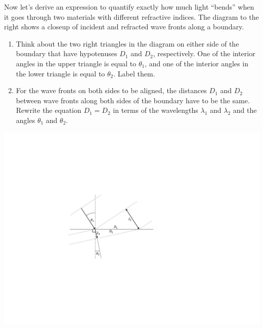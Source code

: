 \begin{minipage}{0.44\textwidth}

Now let's derive an expression to quantify exactly how much light ``bends'' when it goes through two materials with different refractive indices.  The diagram to the right shows a closeup of incident and refracted wave fronts along a boundary.

\begin{enumerate}[labparts]

\item Think about the two right triangles in the diagram on either side of the boundary that have hypotenuses $D_1$ and $D_2$, respectively.  One of the interior angles in the upper triangle is equal to $\theta_1$, and one of the interior angles in the lower triangle is equal to $\theta_2$.  Label them.

\item For the wave fronts on both sides to be aligned, the distances $D_1$ and $D_2$ between wave fronts along both sides of the boundary have to be the same.  Rewrite the equation $D_1 = D_2$ in terms of the wavelengths $\lambda_1$ and $\lambda_2$ and the angles $\theta_1$ and $\theta_2$.
\answerspace{0.7in}
\end{enumerate}
\end{minipage}
\begin{minipage}{0.55\textwidth}
\begin{flushright}
\vspace{-0.4in}
\includegraphics{deriving_snells_law/deriving_snell.pdf}
\end{flushright}
\end{minipage}

